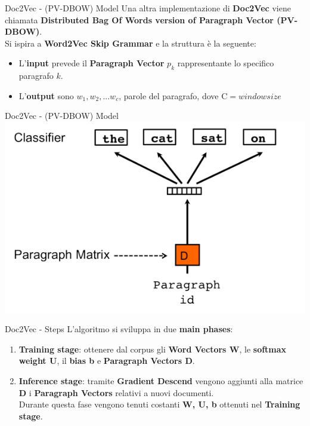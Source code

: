 \documentclass[british]{beamer}
\begin{document}
\begin{frame}{Doc2Vec - (PV-DBOW) Model}
	Una altra implementazione di \textbf{Doc2Vec} viene chiamata \textbf{Distributed Bag Of Words version of Paragraph Vector (PV-DBOW)}.\\
	Si ispira a \textbf{Word2Vec Skip Grammar} e la struttura \`{e} la seguente:
	\begin{itemize}
		\item L'\textbf{input} prevede il \textbf{Paragraph Vector} $p_k$ rappresentante lo specifico paragrafo $k$.
		\item L'\textbf{output} sono $w_{1},w_{2},...w_{c}$, parole del paragrafo, dove $\mathrm{C} = window size$
	\end{itemize}
\end{frame}

\begin{frame}{Doc2Vec - (PV-DBOW) Model}
	\includegraphics[width=0.9\linewidth]{./Imgs/doc2vec-skipgram.png}
\end{frame}

\begin{frame}{Doc2Vec - Steps}
	L'algoritmo si sviluppa in due \textbf{main phases}:
	\begin{enumerate}
		\item \textbf{Training stage}: ottenere dal corpus gli \textbf{Word Vectors W}, le \textbf{softmax weight U}, il \textbf{bias b} e \textbf{Paragraph Vectors D}.
		\item \textbf{Inference stage}: tramite \textbf{Gradient Descend} vengono aggiunti alla matrice \textbf{D} i \textbf{Paragraph Vectors} relativi a nuovi documenti.\\ Durante questa fase vengono tenuti costanti \textbf{W, U, b} ottenuti nel \textbf{Training stage}.
	\end{enumerate}
\end{frame}	
	
\end{document}
